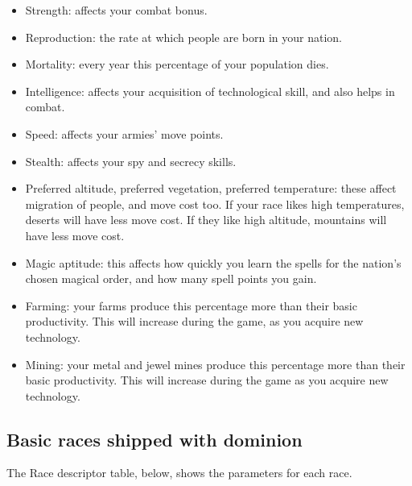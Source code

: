 \begin{itemize}
\item
Strength: affects your combat bonus.
\item
Reproduction: the rate at which people are born in your nation.
\item
Mortality: every year this percentage of your population dies.
\item
Intelligence: affects your acquisition of technological skill, and
also helps in combat.
\item
Speed: affects your armies' move points.
\item
Stealth: affects your spy and secrecy skills.
\item
Preferred altitude, preferred vegetation, preferred temperature: these
affect migration of people, and move cost too.  If your race likes high
temperatures, deserts will have less move cost.  If they like high
altitude, mountains will have less move cost.
\item
Magic aptitude: this affects how quickly you learn the spells for the
nation's chosen magical order, and how many spell points you gain.
\item
Farming: your farms produce this percentage more than their basic
productivity.  This will increase during the game, as you acquire new
technology.
\item
Mining: your metal and jewel mines produce this percentage more than
their basic productivity.  This will increase during the game as you
acquire new technology.
\end{itemize}

\subsection{Basic races shipped with dominion}
The Race descriptor table, below, shows the parameters for each race.

